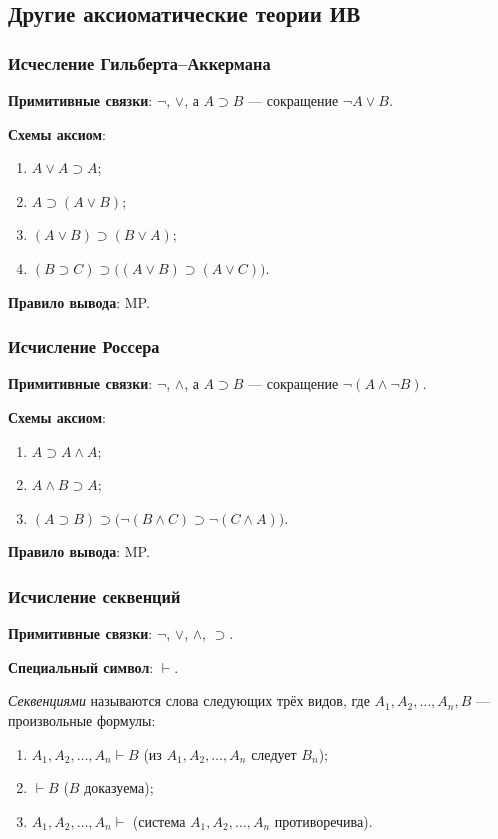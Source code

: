 \subsection{Другие аксиоматические теории ИВ}
\subsubsection{Исчесление Гильберта--Аккермана}

\textbf{Примитивные связки}: $\neg$, $\lor$, а $A \supset B$ --- сокращение $\neg A \lor B$.

\textbf{Схемы аксиом}:
\begin{enumerate}[label=(А\arabic*)]
    \item $A \lor A \supset A$;
    \item $A \supset (A \lor B)$;
    \item $(A \lor B) \supset (B \lor A)$;
    \item $(B \supset C) \supset \big((A \lor B) \supset (A \lor C)\big)$.
\end{enumerate}

\textbf{Правило вывода}: MP.

\subsubsection{Исчисление Россера}
\textbf{Примитивные связки}: $\neg$, $\land$, а $A \supset B$ --- сокращение $\neg(A \land \neg B)$.

\textbf{Схемы аксиом}:
\begin{enumerate}[label=(А\arabic*)]
    \item $A \supset A \land A$;
    \item $A \land B \supset A$;
    \item $(A \supset B) \supset \big(\neg(B \land C) \supset \neg(C \land A)\big)$.
\end{enumerate}

\textbf{Правило вывода}: MP.

\subsubsection{Исчисление секвенций}
\textbf{Примитивные связки}: $\neg$, $\lor$, $\land$, $\supset$.

\textbf{Специальный символ}: $\vdash$.

\textit{Секвенциями} называются слова следующих трёх видов, где $A_1, A_2, \dots, A_n, B$ --- произвольные формулы:
\begin{enumerate}
    \item $A_1, A_2, \dots, A_n \vdash B$ (из $A_1, A_2, \dots, A_n$ следует $B_n$);
    \item $\vdash B$ ($B$ доказуема);
    \item $A_1, A_2, \dots, A_n \vdash$ (система $A_1, A_2, \dots, A_n$ противоречива).
\end{enumerate}


